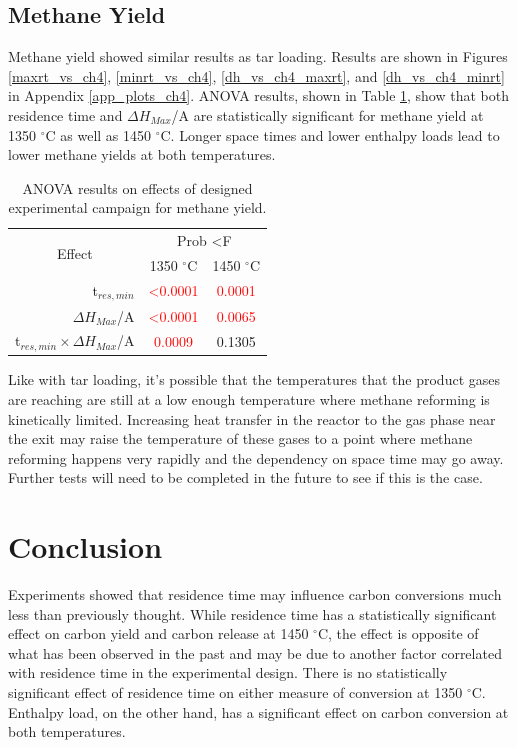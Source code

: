 \documentclass[11pt,twocolumn]{article}
\begin{document}
\subsection*{Methane Yield}

Methane yield showed similar results as tar loading.  Results are shown in Figures \ref{maxrt_vs_ch4}, \ref{minrt_vs_ch4}, \ref{dh_vs_ch4_maxrt}, and \ref{dh_vs_ch4_minrt} in Appendix \ref{app_plots_ch4}.  ANOVA results, shown in Table \ref{anova_ch4}, show that both residence time and $\Delta H_{Max}$/A are statistically significant for methane yield at 1350  $^\circ$C as well as 1450  $^\circ$C.  Longer space times and lower enthalpy loads lead to lower methane yields at both temperatures.

\begin{table}
	\centering
	\caption{ANOVA results on effects of designed experimental campaign for methane yield.}
	\begin{tabular}{r c c}
		\toprule
		\multicolumn{1}{c}{\multirow{2}{*}{Effect}}		& 	\multicolumn{2}{c}{Prob \textless F	}	\\
		{}								&	1350 $^\circ$C	&	1450 $^\circ$C			\\
		\midrule
		t$_{res,min}$						&	\textcolor{red}{\textless 0.0001}	&	\textcolor{red}{0.0001}	\\
		$\Delta H_{Max}$/A					&	\textcolor{red}{\textless 0.0001}	&	\textcolor{red}{0.0065}	\\
		t$_{res,min}\times \Delta H_{Max}$/A	&	\textcolor{red}{0.0009}			&	0.1305				\\
		\bottomrule
	\end{tabular}
	\label{anova_ch4}
\end{table}
 
Like with tar loading, it's possible that the temperatures that the product gases are reaching are still at a low enough temperature where methane reforming is kinetically limited.  Increasing heat transfer in the reactor to the gas phase near the exit may raise the temperature of these gases to a point where methane reforming happens very rapidly and the dependency on space time may go away.  Further tests will need to be completed in the future to see if this is the case.


\section*{Conclusion}

Experiments showed that residence time may influence carbon conversions much less than previously thought.  While residence time has a statistically significant effect on carbon yield and carbon release at 1450 $^\circ$C, the effect is opposite of what has been observed in the past and may be due to another factor correlated with residence time in the experimental design.  There is no statistically significant effect of residence time on either measure of conversion at 1350 $^\circ$C.  Enthalpy load, on the other hand, has a significant effect on carbon conversion at both temperatures.
\end{document}
